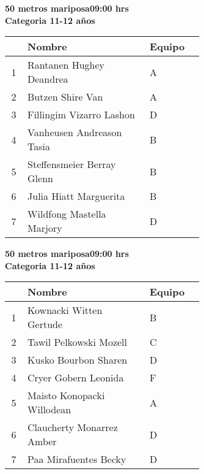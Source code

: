 \begin{minipage}{0.95\linewidth}\vspace{0.5cm} 
\begin{flushleft}
\textbf{
\hspace{-0.15cm}50 metros mariposa\hspace{1.5cm}09:00 hrs \\Categoria 11-12 años}\vspace{-0.2cm} 
\end{flushleft}
\begin{tabular}{cp{0.63\linewidth}l}
\hline
& \textbf{Nombre} & \textbf{Equipo} \\ \hline
1 & Rantanen Hughey Deandrea & A \\ 
2 & Butzen Shire Van & A \\ 
3 & Fillingim Vizarro Lashon & D \\ 
4 & Vanheusen Andreason Tasia & B \\ 
5 & Steffensmeier Berray Glenn & B \\ 
6 & Julia Hiatt Marguerita & B \\ 
7 & Wildfong Mastella Marjory & D \\ 
\end{tabular}
\end{minipage}
\begin{minipage}{0.95\linewidth}\vspace{0.5cm} 
\begin{flushleft}
\textbf{
\hspace{-0.15cm}50 metros mariposa\hspace{1.5cm}09:00 hrs \\Categoria 11-12 años}\vspace{-0.2cm} 
\end{flushleft}
\begin{tabular}{cp{0.63\linewidth}l}
\hline
& \textbf{Nombre} & \textbf{Equipo} \\ \hline
1 & Kownacki Witten Gertude & B \\ 
2 & Tawil Pelkowski Mozell & C \\ 
3 & Kusko Bourbon Sharen & D \\ 
4 & Cryer Gobern Leonida & F \\ 
5 & Maisto Konopacki Willodean & A \\ 
6 & Claucherty Monarrez Amber & D \\ 
7 & Paa Mirafuentes Becky & D \\ 
\end{tabular}
\end{minipage}
